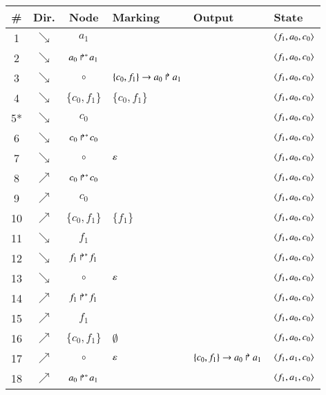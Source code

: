 \newcommand{\xproc}[1]{#1}
\newcommand{\xsol}{\circ}

\begin{table}[p]
  \centering
  \begin{tabular}{|c|c|c|l|l|l|}
    \hline
    \# & Dir. & Node & Marking & Output & State \\\hline\hline
    1  & $\searrow$ & $\xproc{a_1}$ &  &  & $\mbox{$\langle f_1, a_0, c_0 \rangle$}$ \\\hline
    2  & $\searrow$ & $\mbox{$a_0\Rsh^*\!a_1$}$ &  &  & $\mbox{$\langle f_1, a_0, c_0 \rangle$}$ \\\hline
    3  & $\searrow$ & $\xsol$ & $\{c_0, f_1\}\rightarrow a_0\Rsh a_1$ &  & $\mbox{$\langle f_1, a_0, c_0 \rangle$}$ \\\hline
    4  & $\searrow$ & $\{ c_0, f_1 \}$ & $\{ c_0, f_1 \}$ &  & $\mbox{$\langle f_1, a_0, c_0 \rangle$}$ \\\hline
    \phantom{*}%
    5* & $\searrow$ & $\xproc{c_0}$ &  &  & $\mbox{$\langle f_1, a_0, c_0 \rangle$}$ \\\hline
    6  & $\searrow$ & $\mbox{$c_0\Rsh^*\!c_0$}$ &  &  & $\mbox{$\langle f_1, a_0, c_0 \rangle$}$ \\\hline
    7  & $\searrow$ & $\xsol$ & $\varepsilon$ &  & $\mbox{$\langle f_1, a_0, c_0 \rangle$}$ \\\hline
    8  & $\nearrow$ & $\mbox{$c_0\Rsh^*\!c_0$}$ &  &  & $\mbox{$\langle f_1, a_0, c_0 \rangle$}$ \\\hline
    9  & $\nearrow$ & $\xproc{c_0}$ &  &  & $\mbox{$\langle f_1, a_0, c_0 \rangle$}$ \\\hline
    10 & $\nearrow$ & $\{ c_0, f_1 \}$ & $\{ f_1 \}$ &  & $\mbox{$\langle f_1, a_0, c_0 \rangle$}$ \\\hline
    11 & $\searrow$ & $\xproc{f_1}$ &  &  & $\mbox{$\langle f_1, a_0, c_0 \rangle$}$ \\\hline
    12 & $\searrow$ & $\mbox{$f_1\Rsh^*\!f_1$}$ &  &  & $\mbox{$\langle f_1, a_0, c_0 \rangle$}$ \\\hline
    13 & $\searrow$ & $\xsol$ & $\varepsilon$ &  & $\mbox{$\langle f_1, a_0, c_0 \rangle$}$ \\\hline
    14 & $\nearrow$ & $\mbox{$f_1\Rsh^*\!f_1$}$ &  &  & $\mbox{$\langle f_1, a_0, c_0 \rangle$}$ \\\hline
    15 & $\nearrow$ & $\xproc{f_1}$ &  &  & $\mbox{$\langle f_1, a_0, c_0 \rangle$}$ \\\hline
    16 & $\nearrow$ & $\{ c_0, f_1 \}$ & $\emptyset$ &  & $\mbox{$\langle f_1, a_0, c_0 \rangle$}$ \\\hline
    17 & $\nearrow$ & $\xsol$ & $\varepsilon$ & $\{c_0, f_1\}\rightarrow a_0\Rsh a_1$ & $\mbox{$\langle f_1, a_1, c_0 \rangle$}$ \\\hline
    18 & $\nearrow$ & $\mbox{$a_0\Rsh^*\!a_1$}$ &  &  & $\mbox{$\langle f_1, a_1, c_0 \rangle$}$ \\\hline

\end{tabular}
\end{table}
